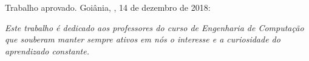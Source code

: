 \documentclass[
	12pt,				%
	openright,			%
	twoside,			%
	a4paper,			%
	english,			%
	french,				%
	spanish,			%
	brazil				%
	]{abntex2}
\begin{document}

%
% 
%
\begin{folhadeaprovacao}

  \begin{center}
    {\ABNTEXchapterfont\large\imprimirautor}

    \vspace*{\fill}\vspace*{\fill}
    \begin{center}
      \ABNTEXchapterfont\bfseries\Large\imprimirtitulo
    \end{center}
    \vspace*{\fill}
    
    \hspace{.45\textwidth}
    \begin{minipage}{.5\textwidth}
        \imprimirpreambulo
    \end{minipage}%
    \vspace*{\fill}
   \end{center}
        
   Trabalho aprovado. Goiânia, \imprimirlocal,  14 de dezembro de 2018:

      
   \begin{center}
    \vspace*{0.5cm}
    {\large\imprimirlocal}
    \par
    {\large\imprimirdata}
    \vspace*{1cm}
  \end{center}
  
\end{folhadeaprovacao}

\begin{dedicatoria}
   \vspace*{\fill}
   \centering
   \noindent
   \textit{ Este trabalho é dedicado aos professores do curso de Engenharia de Computação que souberam manter sempre ativos em nós o interesse e a curiosidade do aprendizado constante. } \vspace*{\fill}
\end{dedicatoria}
\end{document}
